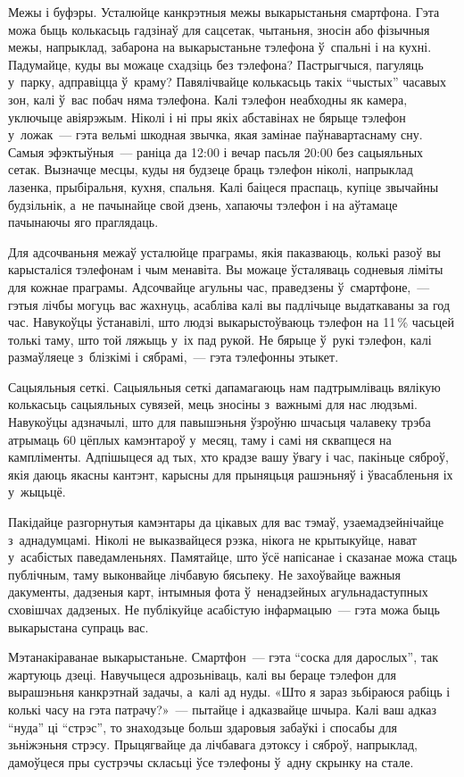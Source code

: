 Межы і буфэры. Усталюйце канкрэтныя межы выкарыстаньня смартфона. Гэта можа быць колькасьць гадзінаў для сацсетак, чытаньня, зносін або фізычныя межы, напрыклад, забарона на выкарыстаньне тэлефона ў~спальні і на кухні. Падумайце, куды вы можаце схадзіць без тэлефона? Пастрыгчыся, пагуляць у~парку, адправіцца ў~краму? Павялічвайце колькасьць такіх ``чыстых'' часавых зон, калі ў~вас побач няма тэлефона. Калі тэлефон неабходны як камера, уключыце авіярэжым. Ніколі і ні пры якіх абставінах не бярыце тэлефон у~ложак~--- гэта вельмі шкодная звычка, якая замінае паўнавартаснаму сну. Самыя эфэктыўныя~--- раніца да 12:00 і вечар пасьля 20:00 без сацыяльных сетак. Вызначце месцы, куды ня будзеце браць тэлефон ніколі, напрыклад лазенка, прыбіральня, кухня, спальня. Калі баіцеся праспаць, купіце звычайны будзільнік, а~не пачынайце свой дзень, хапаючы тэлефон і на аўтамаце пачынаючы яго праглядаць.

Для адсочваньня межаў усталюйце праграмы, якія паказваюць, колькі разоў вы карысталіся тэлефонам і чым менавіта. Вы можаце ўсталяваць содневыя ліміты для кожнае праграмы. Адсочвайце агульны час, праведзены ў~смартфоне,~--- гэтыя лічбы могуць вас жахнуць, асабліва калі вы падлічыце выдаткаваны за год час. Навукоўцы ўстанавілі, што людзі выкарыстоўваюць тэлефон на 11\,\% часьцей толькі таму, што той ляжыць у~іх пад рукой. Не бярыце ў~рукі тэлефон, калі размаўляеце з~блізкімі і сябрамі,~--- гэта тэлефонны этыкет.

Сацыяльныя сеткі. Сацыяльныя сеткі дапамагаюць нам падтрымліваць вялікую колькасьць сацыяльных сувязей, мець зносіны з~важнымі для нас людзьмі. Навукоўцы адзначылі, што для павышэньня ўзроўню шчасьця чалавеку трэба атрымаць 60 цёплых камэнтароў у~месяц, таму і самі ня сквапцеся на кампліменты. Адпішыцеся ад тых, хто крадзе вашу ўвагу і час, пакіньце сяброў, якія даюць якасны кантэнт, карысны для прыняцьця рашэньняў і ўвасабленьня іх у~жыцьцё.

Пакідайце разгорнутыя камэнтары да цікавых для вас тэмаў, узаемадзейнічайце з~аднадумцамі. Ніколі не выказвайцеся рэзка, нікога не крытыкуйце, нават у~асабістых паведамленьнях. Памятайце, што ўсё напісанае і сказанае можа стаць публічным, таму выконвайце лічбавую бясьпеку. Не захоўвайце важныя дакументы, дадзеныя карт, інтымныя фота ў~ненадзейных агульнадаступных сховішчах дадзеных. Не публікуйце асабістую інфармацыю~--- гэта можа быць выкарыстана супраць вас.

Мэтанакіраванае выкарыстаньне. Смартфон~--- гэта ``соска для дарослых'', так жартуюць дзеці. Навучыцеся адрозьніваць, калі вы бераце тэлефон для вырашэньня канкрэтнай задачы, а~калі ад нуды. «Што я зараз зьбіраюся рабіць і колькі часу на гэта патрачу?»~--- пытайце і адказвайце шчыра. Калі ваш адказ ``нуда'' ці ``стрэс'', то знаходзьце больш здаровыя забаўкі і спосабы для зьніжэньня стрэсу. Прыцягвайце да лічбавага дэтоксу і сяброў, напрыклад, дамоўцеся пры сустрэчы скласьці ўсе тэлефоны ў~адну скрынку на стале.

